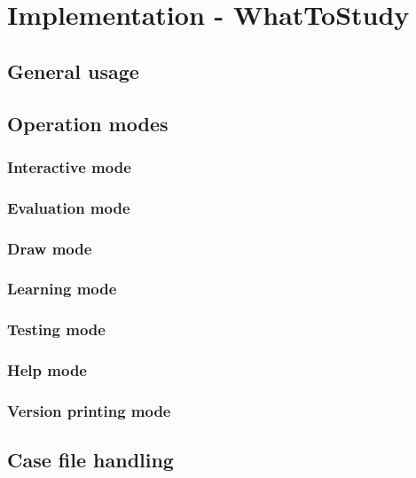 \documentclass[%
	pdftex,
	oneside,        %
	11pt,           %
	parskip=half,   %
	headsepline,    %
	footsepline,    %
	abstracton,     %
	USenglish,      %
	a4paper,        %
]{report}
\begin{document}
\chapter{Implementation - WhatToStudy}
\label{chapter:WhatToStudy}
\section{General usage}

\section{Operation modes}
\subsection{Interactive mode}
\subsection{Evaluation mode}
\subsection{Draw mode}
\subsection{Learning mode}
\label{sec:Test}
\subsection{Testing mode}
\subsection{Help mode}
\subsection{Version printing mode}

\section{Case file handling}
\label{sec:CaseFile}
%

\lstlistoflistings
\printbibliography

\begin{appendices}




\end{appendices}
\end{document}
